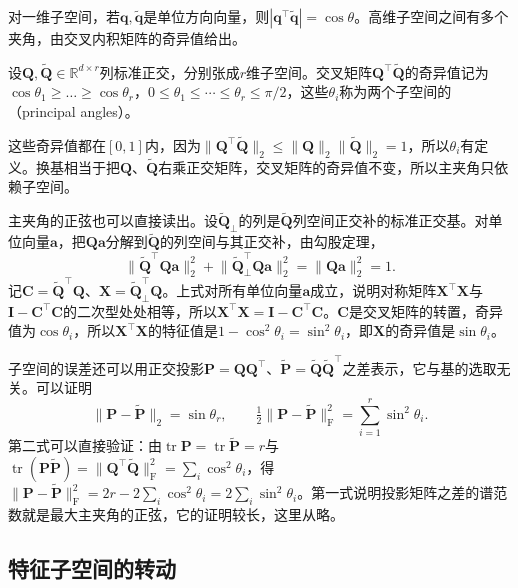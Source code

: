 对一维子空间，若$\bm q,\widetilde{\bm q}$是单位方向向量，则$|\bm q^\top\widetilde{\bm q}|=\cos\theta$。高维子空间之间有多个夹角，由交叉内积矩阵的奇异值给出。
\begin{definition}[主夹角]
\label{def:matrix-analysis-principal-angles}
设$\bm Q,\widetilde{\bm Q}\in\mathbb R^{d\times r}$列标准正交，分别张成$r$维子空间。交叉矩阵$\bm Q^\top\widetilde{\bm Q}$的奇异值记为$\cos\theta_1\geq\dots\geq\cos\theta_r$，$0\leq\theta_1\leq\cdots\leq\theta_r\leq\pi/2$，这些$\theta_i$称为两个子空间的（principal angles）。
\end{definition}
这些奇异值都在$[0,1]$内，因为$\lVert\bm Q^\top\widetilde{\bm Q}\rVert_2\leq\lVert\bm Q\rVert_2\lVert\widetilde{\bm Q}\rVert_2=1$，所以$\theta_i$有定义。换基相当于把$\bm Q$、$\widetilde{\bm Q}$右乘正交矩阵，交叉矩阵的奇异值不变，所以主夹角只依赖子空间。

主夹角的正弦也可以直接读出。设$\widetilde{\bm Q}_\perp$的列是$\widetilde{\bm Q}$列空间正交补的标准正交基。对单位向量$\bm a$，把$\bm Q\bm a$分解到$\widetilde{\bm Q}$的列空间与其正交补，由勾股定理，
\[
 \lVert\widetilde{\bm Q}^\top\bm Q\bm a\rVert_2^2+\lVert\widetilde{\bm Q}_\perp^\top\bm Q\bm a\rVert_2^2=\lVert\bm Q\bm a\rVert_2^2=1 .
\]
记$\bm C=\widetilde{\bm Q}^\top\bm Q$、$\bm X=\widetilde{\bm Q}_\perp^\top\bm Q$。上式对所有单位向量$\bm a$成立，说明对称矩阵$\bm X^\top\bm X$与$\bm I-\bm C^\top\bm C$的二次型处处相等，所以$\bm X^\top\bm X=\bm I-\bm C^\top\bm C$。$\bm C$是交叉矩阵的转置，奇异值为$\cos\theta_i$，所以$\bm X^\top\bm X$的特征值是$1-\cos^2\theta_i=\sin^2\theta_i$，即$\bm X$的奇异值是$\sin\theta_i$。

子空间的误差还可以用正交投影$\bm P=\bm Q\bm Q^\top$、$\widetilde{\bm P}=\widetilde{\bm Q}\widetilde{\bm Q}^\top$之差表示，它与基的选取无关。可以证明
\[
 \lVert\bm P-\widetilde{\bm P}\rVert_2=\sin\theta_r,\qquad
 \tfrac12\lVert\bm P-\widetilde{\bm P}\rVert_{\mathrm F}^2=\sum_{i=1}^r\sin^2\theta_i .
\]
第二式可以直接验证：由$\operatorname{tr}\bm P=\operatorname{tr}\widetilde{\bm P}=r$与$\operatorname{tr}(\bm P\widetilde{\bm P})=\lVert\bm Q^\top\widetilde{\bm Q}\rVert_{\mathrm F}^2=\sum_i\cos^2\theta_i$，得$\lVert\bm P-\widetilde{\bm P}\rVert_{\mathrm F}^2=2r-2\sum_i\cos^2\theta_i=2\sum_i\sin^2\theta_i$。第一式说明投影矩阵之差的谱范数就是最大主夹角的正弦，它的证明较长，这里从略。

\subsection{特征子空间的转动}

